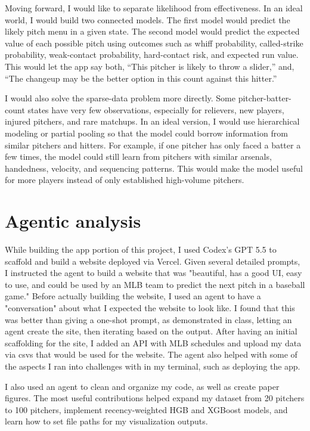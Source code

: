 \documentclass[9pt,twoside]{pnas-new}
\begin{document}
Moving forward, I would like to separate likelihood from effectiveness. In an ideal world, I would build two connected models. The first model would predict the likely pitch menu in a given state. The second model would predict the expected value of each possible pitch using outcomes such as whiff probability, called-strike probability, weak-contact probability, hard-contact risk, and expected run value. This would let the app say both, ``This pitcher is likely to throw a slider,'' and, ``The changeup may be the better option in this count against this hitter.''

I would also solve the sparse-data problem more directly. Some pitcher-batter-count states have very few observations, especially for relievers, new players, injured pitchers, and rare matchups. In an ideal version, I would use hierarchical modeling or partial pooling so that the model could borrow information from similar pitchers and hitters. For example, if one pitcher has only faced a batter a few times, the model could still learn from pitchers with similar arsenals, handedness, velocity, and sequencing patterns. This would make the model useful for more players instead of only established high-volume pitchers.

\section*{Agentic analysis}

While building the app portion of this project, I used Codex's GPT 5.5 to scaffold and build a website deployed via Vercel. Given several detailed prompts, I instructed the agent to build a website that was "beautiful, has a good UI, easy to use, and could be used by an MLB team to predict the next pitch in a baseball game." Before actually building the website, I used an agent to have a "conversation" about what I expected the website to look like. I found that this was better than giving a one-shot prompt, as demonstrated in class, letting an agent create the site, then iterating based on the output. After having an initial scaffolding for the site, I added an API with MLB schedules and upload my data via csvs that would be used for the website. The agent also helped with some of the aspects I ran into challenges with in my terminal, such as deploying the app.

I also used an agent to clean and organize my code, as well as create paper figures. The most useful contributions helped expand my dataset from 20 pitchers to 100 pitchers, implement recency-weighted HGB and XGBoost models, and learn how to set file paths for my visualization outputs.
\end{document}
